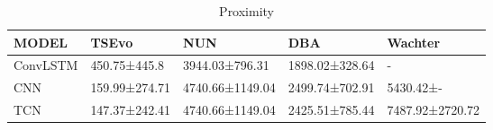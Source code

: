\begin{table*}[h!]
\centering
\caption{Proximity}
\begin{tabular}{lllll}
\toprule
 MODEL & TSEvo & NUN & DBA & Wachter \\ 
\toprule
ConvLSTM & 450.75±445.8 & 3944.03±796.31 & 1898.02±328.64 & - \\
CNN & 159.99±274.71 & 4740.66±1149.04 & 2499.74±702.91 & 5430.42±- \\
TCN & 147.37±242.41 & 4740.66±1149.04 & 2425.51±785.44 & 7487.92±2720.72 \\
\bottomrule \end{tabular}\label{tab:proximity}
\end{table*}